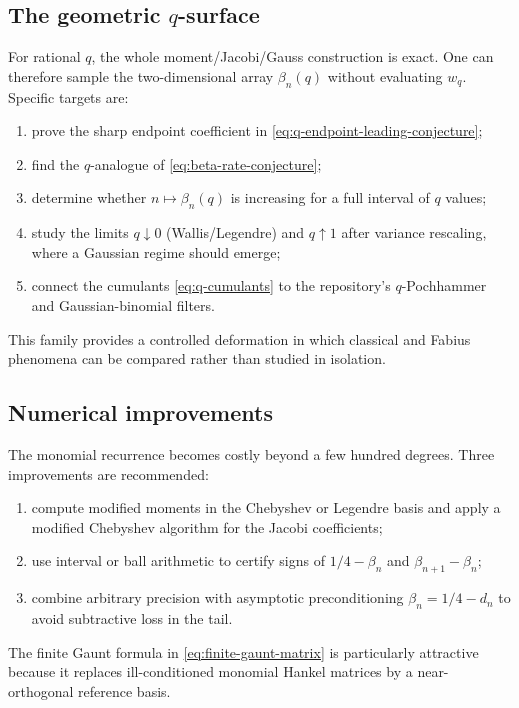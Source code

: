 \documentclass[11pt,oneside]{article}
\theoremstyle{definition}
\theoremstyle{remark}
\numberwithin{equation}{section}
\begin{document}
\subsection{The geometric \texorpdfstring{$q$}{q}-surface}
For rational $q$, the whole moment/Jacobi/Gauss construction is exact.  One
can therefore sample the two-dimensional array $\beta_n(q)$ without evaluating
$w_q$.  Specific targets are:
\begin{enumerate}
\item prove the sharp endpoint coefficient in
      \cref{eq:q-endpoint-leading-conjecture};
\item find the $q$-analogue of \cref{eq:beta-rate-conjecture};
\item determine whether $n\mapsto\beta_n(q)$ is increasing for a full interval
      of $q$ values;
\item study the limits $q\downarrow0$ (Wallis/Legendre) and $q\uparrow1$
      after variance rescaling, where a Gaussian regime should emerge;
\item connect the cumulants \cref{eq:q-cumulants} to the repository's
      $q$-Pochhammer and Gaussian-binomial filters.
\end{enumerate}
This family provides a controlled deformation in which classical and Fabius
phenomena can be compared rather than studied in isolation.

\subsection{Numerical improvements}
The monomial recurrence becomes costly beyond a few hundred degrees.  Three
improvements are recommended:
\begin{enumerate}
\item compute modified moments in the Chebyshev or Legendre basis and apply a
      modified Chebyshev algorithm for the Jacobi coefficients;
\item use interval or ball arithmetic to certify signs of
      $1/4-\beta_n$ and $\beta_{n+1}-\beta_n$;
\item combine arbitrary precision with asymptotic preconditioning
      $\beta_n=1/4-d_n$ to avoid subtractive loss in the tail.
\end{enumerate}
The finite Gaunt formula in \cref{eq:finite-gaunt-matrix} is particularly
attractive because it replaces ill-conditioned monomial Hankel matrices by a
near-orthogonal reference basis.
\end{document}
